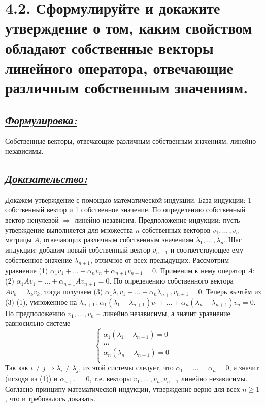 \documentclass{article}
\begin{document}
\section*{\LARGE 4.2. Сформулируйте и докажите утверждение о том, каким свойством обладают собственные векторы линейного оператора, отвечающие различным собственным значениям.  }
\subsection*{\Large \underline{\textit{Формулировка: }}}
Собственные векторы, отвечающие различным собственным значениям, линейно независимы.

\subsection*{\Large \underline{\textit{Доказательство: }}}
Докажем утверждение с помощью математической индукции. 
\newline База индукции: 1 собственный вектор и 1 собственное значение. По определению собственный вектор ненулевой $\Rightarrow$ линейно независим.
\newline Предположение индукции: пусть утверждение выполняется для множества $n$ собственных векторов $v_1, ...\,, v_n$ матрицы $A$, отвечающих различным собственным значениям $\lambda_1, ...\,, \lambda_n$.
\newline Шаг индукции: добавим новый собственный вектор $v_{n+1}$ и соответствующее ему собственное значение $\lambda_{n + 1}$, отличное от всех предыдущих. Рассмотрим уравнение (1) $\alpha_1v_1 + ... + \alpha_nv_n + \alpha_{n + 1}v_{n + 1} = 0$. Применим к нему оператор $A$: (2) $\alpha_1Av_1 + ... + \alpha_{n+1}Av_{n+1} = 0$. По определению собственного вектора $Av_k = \lambda_kv_k$, тогда получаем (3) $\alpha_1\lambda_1v_1 + ... + \alpha_n\lambda_{n+1}v_{n+1} = 0$. Теперь вычтём из (3) (1), умноженное на $\lambda_{n + 1}$: $\alpha_1(\lambda_1 - \lambda_{n+1})v_1 + ... + \alpha_n(\lambda_n - \lambda_{n+1})v_n = 0$. По предположению $v_1, ...\,, v_n$ -- линейно независимы, а значит уравнение равносильно системе
$$
\begin{cases}
\alpha_1(\lambda_1 - \lambda_{n+1}) = 0 \\
... \\
\alpha_n(\lambda_n - \lambda_{n + 1}) = 0 \\
\end{cases}
$$
Так как $i \ne j \Rightarrow \lambda_i \ne \lambda_j$, из этой системы следует, что $\alpha_1 = ... = \alpha_n = 0$, а значит (исходя из (1)) и $\alpha_{n + 1} = 0$, т.е. векторы $v_1, ...\,, v_n, v_{n+1}$ линейно независимы.
\newline Согласно принципу математической индукции, утверждение верно для всех 
\newline $n \ge 1$, что и требовалось доказать.
\end{document}
